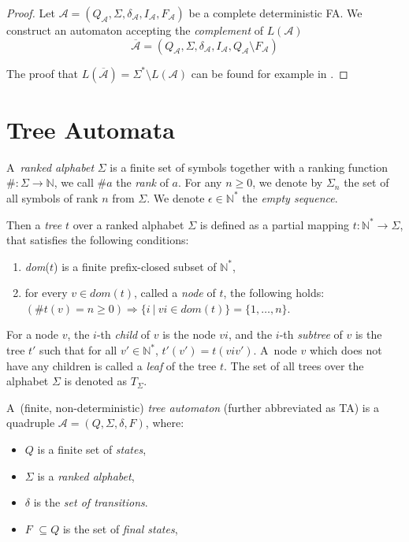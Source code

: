 	\begin{proof}
Let $\mathcal{A} = (Q_\mathcal{A}, \Sigma, \delta_\mathcal{A}, I_\mathcal{A},
F_\mathcal{A})$ be a complete deterministic FA. We construct an automaton
accepting the \emph{complement} of $L(\mathcal{A})$ 
\begin{equation}
\overline{\mathcal{A}} =
(Q_\mathcal{A}, \Sigma, \delta_\mathcal{A}, I_\mathcal{A}, Q_\mathcal{A}
\setminus F_\mathcal{A})
\end{equation}
	
The proof that $L(\overline{\mathcal{A}}) = \Sigma^* \setminus L(\mathcal{A})$
can be found for example in \cite{tin}.
 \end{proof}

 \section{Tree Automata}

 A~\emph{ranked alphabet} $\Sigma$ is a finite set of symbols together with a
 ranking function $\#: \Sigma \to \mathbb{N}$, we call $\#a$ the \emph{rank}
 of $a$. For any $n \geq 0$, we denote by $\Sigma_n$ the set of all symbols of rank
 $n$ from $\Sigma$. We denote $\epsilon \in \mathbb{N}^*$ the \emph{empty
 sequence}.

Then a \emph{tree} $t$ over a ranked alphabet $\Sigma$ is defined as a partial
mapping $t : \mathbb{N}^* \to \Sigma$, that satisfies the following conditions:
 \begin{enumerate}
  \item \emph{dom}($t$) is a finite prefix-closed subset of $\mathbb{N}^*$,
  \item for every $v \in dom(t)$, called a \emph{node} of $t$, the following
holds: $(\#t(v) = n \geq 0) \Longrightarrow \{i\ |\ vi \in dom(t)\} =
\{1,\ldots,n\}$.
 \end{enumerate}

For a node $v$, the $i$-th \emph{child} of $v$ is the node $vi$, and the $i$-th
\emph{subtree} of $v$ is the tree $t'$ such that for all $v' \in \mathbb{N}^*$, 
$t'(v') = t(viv')$. A~node $v$ which does not have any children is called a
\emph{leaf} of the tree $t$. The set of all trees over the alphabet $\Sigma$ is
denoted as $T_\Sigma$.

A~(finite, non-deterministic) \emph{tree automaton} (further abbreviated as TA)
is a quadruple $\mathcal{A} = (Q, \Sigma, \delta, F)$, where:
 \begin{itemize}
   \item $Q$ is a finite set of \emph{states},
	\item $\Sigma$ is a \emph{ranked alphabet},
	\item $\delta$ is the \emph{set of transitions}.
	\item $F$ $ \subseteq Q$ is the set of \emph{final states},
 \end{itemize}

